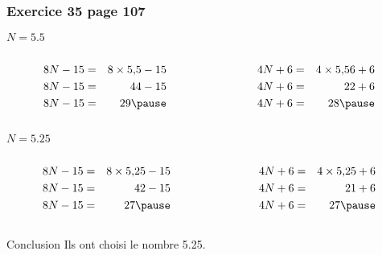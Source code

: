 \documentclass[xcolor={dvipsnames}]{beamer}
\begin{document}
\begin{frame}
	\frametitle{Exercice 35 page 107}
	
	\begin{block}{$N = \num{5.5}$}
		
		\begin{columns}
			\begin{column}{0.5\textwidth}
				\begin{eqnarray*}
					8N - 15 &=&  8 \times \num{5.5} - 15 \\ 
					8N - 15 &=& 44 - 15 \\ 
					8N - 15 &=& 29 \pause
				\end{eqnarray*}
			\end{column}
			
			
			\begin{column}{0.5\textwidth}
				\begin{eqnarray*}
					4N + 6 &=&  4 \times \num{5.5}6 + 6 \\ 
					4N + 6 &=& 22 + 6 \\ 
					4N + 6 &=& 28 \pause
				\end{eqnarray*}
			\end{column}
		\end{columns}
		
	\end{block}
	
	
	\begin{block}{$N = \num{5.25}$}
		
		\begin{columns}
			\begin{column}{0.5\textwidth}
				\begin{eqnarray*}
					8N - 15 &=&  8 \times \num{5.25} - 15 \\ 
					8N - 15 &=& 42 - 15 \\ 
					8N - 15 &=& 27 \pause
				\end{eqnarray*}
			\end{column}
			
			
			\begin{column}{0.5\textwidth}
				\begin{eqnarray*}
					4N + 6 &=&  4 \times \num{5.25} + 6 \\ 
					4N + 6 &=& 21 + 6 \\ 
					4N + 6 &=& 27 \pause 
				\end{eqnarray*}
			\end{column}
		\end{columns}
		
	\end{block}
	
	\begin{alertblock}{Conclusion}
		Ils ont choisi le nombre \num{5.25}.
	\end{alertblock}
	
\end{frame}
\end{document}
